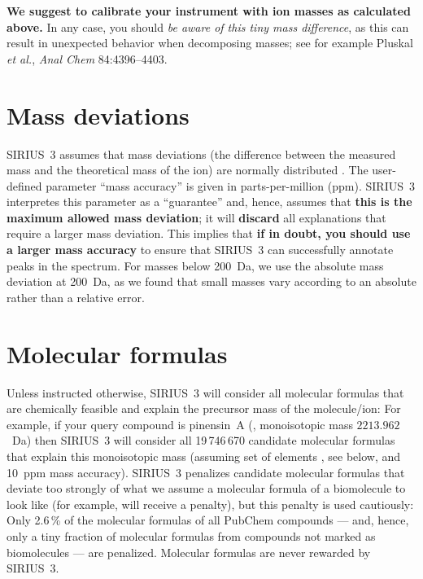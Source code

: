 \documentclass[letterpaper,10pt,openany,oneside]{sphinxmanual}
\begin{document}
\textbf{We suggest to calibrate your instrument with ion masses as calculated
above.}  In any case, you should \emph{be aware of this tiny mass
difference}, as this can result in unexpected behavior when decomposing
masses; see for example Pluskal \emph{et al.}, \emph{Anal Chem} 84:4396--4403.


\section{Mass deviations}
\label{sec:mass-deviations}

SIRIUS~3 assumes that mass deviations (the difference between the measured
mass and the theoretical mass of the ion) are normally distributed
\citep{jaitly06robust, zubarev07proper, boecker16fragmentation}.  The
user-defined parameter ``mass accuracy'' is given in parts-per-million (ppm).
SIRIUS~3 interpretes this parameter as a ``guarantee'' and, hence, assumes
that \textbf{this is the maximum allowed mass deviation}; it
will \textbf{discard} all explanations that require a larger mass deviation.
This implies that \textbf{if in doubt, you should use a larger mass accuracy}
to ensure that SIRIUS~3 can successfully annotate peaks in the spectrum.  
For masses below 200~Da, we
use the absolute mass deviation at 200~Da, as we found that small masses vary
according to an absolute rather than a relative error.


\section{Molecular formulas}

Unless instructed otherwise, SIRIUS~3 will consider all molecular formulas
that are chemically feasible and explain the precursor mass of the
molecule/ion: For example, if your query compound is pinensin~A
(, monoisotopic mass $2213.962$~Da) then SIRIUS~3 will
consider all 19\,746\,670 candidate molecular formulas that explain this
monoisotopic mass (assuming set of elements , see below, and
10~ppm mass accuracy).  SIRIUS~3 penalizes candidate molecular formulas that
deviate too strongly of what we assume a molecular formula of a biomolecule
to look like (for example,  will receive a penalty), but this
penalty is used cautiously: Only 2.6\,\% of the molecular formulas of all
PubChem compounds --- and, hence, only a tiny fraction of molecular formulas
from compounds not marked as biomolecules --- are penalized.  Molecular
formulas are never rewarded by SIRIUS~3.
\end{document}
